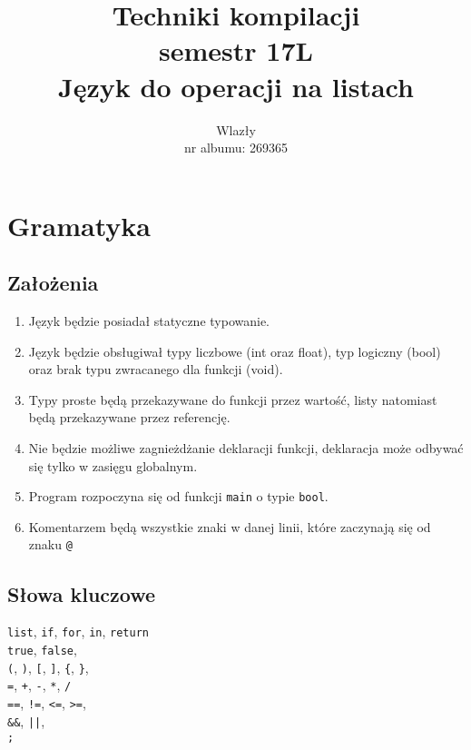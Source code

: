 \documentclass{article}
\title{\vspace{7cm}\LARGE Techniki kompilacji\\semestr 17L\\Język do operacji na listach}
\author{\LargeŁukasz Wlazły\\nr albumu: 269365}
\date{}
\newcommand{\keyword}[1]{\colorbox{light-gray}{\texttt{#1}}}
\newcommand{\code}[1]{\texttt{#1}}
\begin{document}
\maketitle
{}
\newpage
{}

\section{Gramatyka}

\subsection{Założenia}
\begin{enumerate}
\item Język będzie posiadał statyczne typowanie.
\item Język będzie obsługiwał typy liczbowe (int oraz float), typ logiczny (bool) oraz brak typu zwracanego dla funkcji (void).
\item Typy proste będą przekazywane do funkcji przez wartość, listy natomiast będą przekazywane przez referencję.
\item Nie będzie możliwe zagnieżdżanie deklaracji funkcji, deklaracja może odbywać się tylko w zasięgu globalnym.
\item Program rozpoczyna się od funkcji \code{main} o typie \keyword{bool}.
\item Komentarzem będą wszystkie znaki w danej linii, które zaczynają się od znaku \keyword{@}
\end{enumerate}

\subsection{Słowa kluczowe}
\keyword{list}, \keyword{if}, \keyword{for}, \keyword{in}, \keyword{return}\\
\keyword{true}, \keyword{false}, \\
\keyword{(}, \keyword{)}, \keyword{[}, \keyword{]}, \keyword{\{}, \keyword{\}}, \\
\keyword{=}, \keyword{+}, \keyword{-}, \keyword{*}, \keyword{/} \\
\keyword{==}, \keyword{!=}, \keyword{<=}, \keyword{>=}, \\
\keyword{\&\&}, \keyword{||}, \\
\keyword{;}
\end{document}
